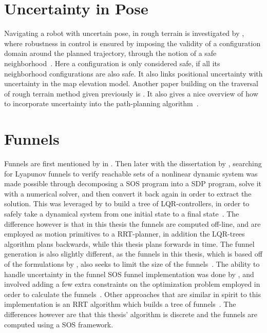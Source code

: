 \section{Uncertainty in Pose}

Navigating a robot with uncertain pose, in rough terrain is investigated by
\citeauthor{haitMotionPlanningRough1996}, where robustness in control is ensured
by imposing the validity of a configuration domain around the planned
trajectory, through the notion of a safe
neighborhood~\cite{haitMotionPlanningRough1996}. Here a configuration is only
considered safe, if all its neighborhood configurations are also safe. It also
links positional uncertainty with uncertainty in the map elevation model.
Another paper building on the traversal of rough terrain method given previously
is \citeauthor{iagnemmaRapidPhysicsbasedRoughterrain1999}. It also gives a nice
overview of how to incorporate uncertainty into the path-planning
algorithm~\cite{iagnemmaRapidPhysicsbasedRoughterrain1999}.

\section{Funnels}

Funnels are first mentioned by \citeauthor{masonMechanicsManipulation1985} in
\citeyear{masonMechanicsManipulation1985}. Then later with the dissertation
 by
\citeauthor{parilloStructuredSemidefinitePrograms}, searching for Lyapunov
funnels to verify reachable sets of a nonlinear dynamic system was made possible
through decomposing a \ac{SOS} program into a \ac{SDP} program, solve it with a
numerical solver, and then convert it back again in order to extract the
solution. This was leveraged by \citeauthor{tedrakeLQRtreesFeedbackMotion2009}
to build a tree of \ac{LQR}-controllers, in order to safely take a dynamical
system from one initial state to a final
state~\cite{tedrakeLQRtreesFeedbackMotion2009}. The difference however is that
in this thesis the funnels are computed off-line, and are employed as motion
primitives to a \ac{RRT}-planner, in addition the \ac{LQR}-trees algorithm plans
backwards, while this thesis plans forwards in time. The funnel generation is
also slightly different, as the funnels in this thesis, which is based off of
the formulations by \citeauthor{majumdarFunnelLibrariesRealtime2017}, also seeks
to limit the size of the funnels~\cite{majumdarFunnelLibrariesRealtime2017}. The
ability to handle uncertainty in the funnel \ac{SOS} funnel implementation was
done by \citeauthor{majumdarRobustOnlineMotion2013}, and involved adding a few
extra constraints on the optimization problem employed in order to calculate the
funnels~\cite{majumdarRobustOnlineMotion2013}. Other approaches that are similar
in spirit to this implementation is an \ac{RRT} algorithm which builds a tree of
funnels~\cite{lenySequentialCompositionRobust2012}. The differences however are
that this thesis' algorithm is discrete and the funnels are computed using a
\ac{SOS} framework.

